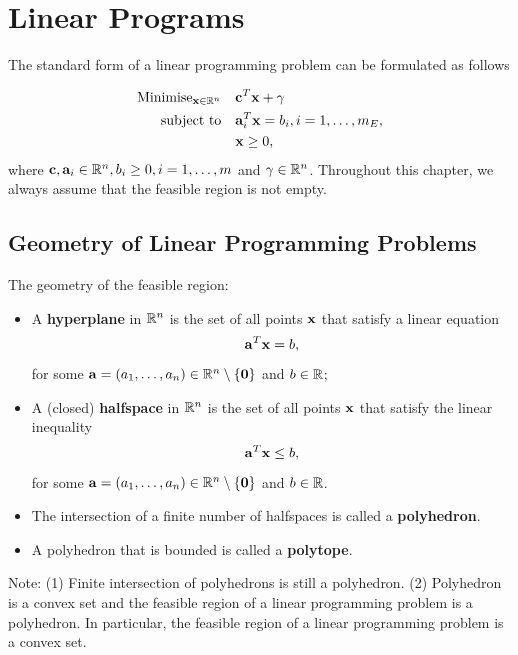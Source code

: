 \chapter{Linear Programs}

The standard form of a linear programming problem can be formulated as follows

\begin{align*}
    \text{Minimise}_{\mathbf{x} \in \mathbb{R}^n} \quad & \mathbf{c}^T \mathbf{x} + \gamma                    \\
    \text{subject to} \quad               & \mathbf{a}_i^T \mathbf{x} = b_i, i = 1, \dots, m_E, \\
                                          & \mathbf{x} \geq 0,
\end{align*}
where \(\mathbf{c}, \mathbf{a}_i \in \mathbb{R}^n, b_i \geq 0, i = 1, \dots, m\) and \(\gamma \in \mathbb{R}^n\). Throughout this chapter, we always assume that the feasible region is not empty.

\section{Geometry of Linear Programming Problems}

The geometry of the feasible region:

\begin{itemize}
    \item A \textbf{hyperplane} in \(\mathbb{R}^n\) is the set of all points \(\mathbf{x}\) that satisfy a linear equation
          \[\mathbf{a}^T \mathbf{x} = b,\]
          for some \(\mathbf{a} = (a_1, \dots, a_n) \in \mathbb{R}^n \setminus \{\mathbf{0}\}\) and \(b \in \mathbb{R}\);
    \item A (closed) \textbf{halfspace} in \(\mathbb{R}^n\) is the set of all points \(\mathbf{x}\) that satisfy the linear inequality
          \[\mathbf{a}^T \mathbf{x} \leq b,\]
          for some \(\mathbf{a} = (a_1, \dots, a_n) \in \mathbb{R}^n \setminus \{\mathbf{0}\}\) and \(b \in \mathbb{R}\).
    \item The intersection of a finite number of halfspaces is called a \textbf{polyhedron}.
    \item A polyhedron that is bounded is called a \textbf{polytope}.
\end{itemize}

Note: (1) Finite intersection of polyhedrons is still a polyhedron. (2) Polyhedron is a convex set and the feasible region of a linear programming problem is a polyhedron. In particular, the feasible region of a linear programming problem is a convex set.

